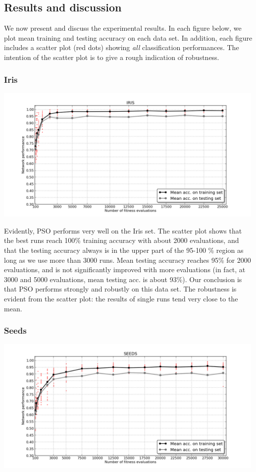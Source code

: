 \documentclass[a4paper,final,9pt]{article}
\begin{document}
\subsection{Results and discussion}

We now present and discuss the experimental results. In each figure below, we
plot mean training and testing accuracy on each data set. In addition, each
figure includes a scatter plot (red dots) showing \emph{all} classification
performances.  The intention of the scatter plot is to give a rough indication
of robustness.

\subsubsection{Iris}
\includegraphics[width=0.99\textwidth]{iris-ann-performance.png}

\noindent
Evidently, PSO performs very well on the Iris set. The scatter plot shows that
the best runs reach 100\% training accuracy with about 2000 evaluations, and
that the testing accuracy always is in the upper part of the 95-100 \%
region as long as we use more than 3000 runs. Mean testing accuracy reaches
95\% for 2000 evaluations, and is not significantly improved with more
evaluations (in fact, at 3000 and 5000 evaluations, mean testing acc. is about
93\%). Our conclusion is that PSO performs strongly and robustly on this data
set. The robustness is evident from the scatter plot: the results of single
runs tend very close to the mean.

\subsubsection{Seeds}
\includegraphics[width=0.99\textwidth]{seeds-ann-performance.png}
\end{document}
